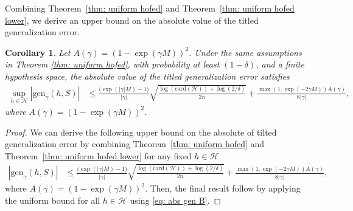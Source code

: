 \documentclass{article}
\theoremstyle{plain}
\theoremstyle{plain}
\newtheorem{corollary}[theorem]{Corollary}
\theoremstyle{definition}
\theoremstyle{remark}
\begin{document}
Combining Theorem~\ref{thm: uniform hofed} and Theorem~\ref{thm: uniform hofed lower}, we derive an upper bound on the absolute value of the titled generalization error.
\begin{tcolorbox}
\begin{corollary}\label{cor: |gen|}
Let $A(\gamma)=(1-\exp(\gamma M))^2$. Under the same assumptions in Theorem \ref{thm: uniform hofed}, with probability at least $(1-\delta)$, and a finite hypothesis space, the absolute value of the titled generalization error satisfies 
    \begin{equation} \nonumber 
        \begin{split}
            \sup_{h\in\mathcal{H}}| \mathrm{gen}_{\gamma}(h,S)|&\leq \frac{\big(\exp(|\gamma|M)-1\big)}{|\gamma|}\sqrt{\frac{\log(\mathrm{card}(\mathcal{H}))+\log(2/\delta)}{2n}}+\frac{\max(1,\exp(-2\gamma M))A(\gamma)}{8|\gamma|},
        \end{split}
    \end{equation}
    where $A(\gamma)=(1-\exp(\gamma M))^2$.
\end{corollary}
\end{tcolorbox}
\begin{proof}
    We can derive the following upper bound on the absolute of tilted generalization error by combining Theorem~\ref{thm: uniform hofed} and Theorem~\ref{thm: uniform hofed lower} for any fixed $h\in\mathcal{H}$
     \begin{equation} \label{eq: abs gen B}
        \begin{split}
           | \mathrm{gen}_{\gamma}(h,S)|&\leq \frac{\big(\exp(|\gamma|M)-1\big)}{|\gamma|}\sqrt{\frac{\log(\mathrm{card}(\mathcal{H}))+\log(2/\delta)}{2n}}+\frac{\max(1,\exp(-2\gamma M))A(\gamma)}{8|\gamma|},
        \end{split}
    \end{equation}
     where $A(\gamma)=(1-\exp(\gamma M))^2$. Then, the final result follow  by applying the uniform bound for all $h\in\mathcal{H}$ using \eqref{eq: abs gen B}.
\end{proof}
\end{document}
